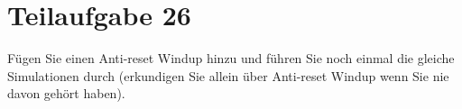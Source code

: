\section{Teilaufgabe 26}
\begin{aufgabe}
    Fügen Sie einen Anti-reset Windup hinzu und führen Sie noch einmal die 
    gleiche Simulationen durch (erkundigen Sie allein über Anti-reset Windup 
    wenn Sie nie davon gehört haben).
\end{aufgabe}
